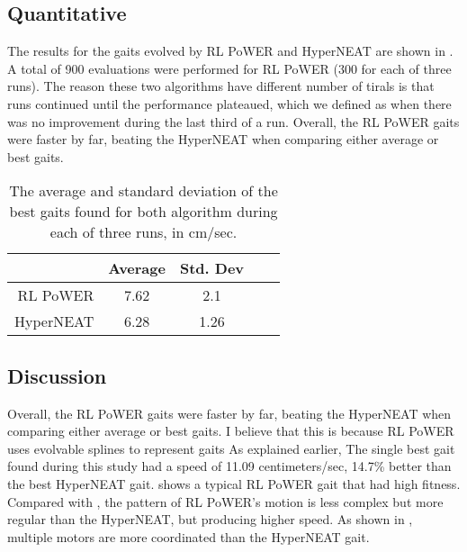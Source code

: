 \subsection{Quantitative}
The results for the gaits evolved by RL PoWER and HyperNEAT are shown in . A total of 900 evaluations were performed for RL PoWER (300 for each of three runs). The reason these two algorithms have different number of tirals is that runs continued until the performance plateaued, which we defined as when there was no improvement during the last third of a run. Overall, the RL PoWER gaits were
faster by far, beating the HyperNEAT when comparing
either average or best gaits.

\begin{table}
\begin{center}
\begin{tabular}{|r|c|c|c||c|}
\hline
                                         & Average & Std. Dev \\
\hline                                    
\hline                                    
RL PoWER                       & 7.62  &    2.1   \\
\hline
HyperNEAT                      & 6.28   &   1.26   \\
\hline
\end{tabular}
\caption{The average and standard deviation of the best gaits found
  for both algorithm during each of three runs, in cm/sec.}  
\end{center}
\end{table}

\subsection{Discussion}
Overall, the RL PoWER gaits were
faster by far, beating the HyperNEAT when comparing
either average or best gaits. I believe that this is because RL PoWER uses evolvable splines to represent gaits As explained earlier,  
The single best gait found during this study had a speed of 11.09 centimeters/sec,  14.7\% better than the best HyperNEAT gait.  shows a typical RL PoWER gait that had high fitness. Compared with , the pattern of RL PoWER's motion is less
complex but more regular than the HyperNEAT, but producing higher speed. As shown in 
, multiple motors are more coordinated than the HyperNEAT gait. 

